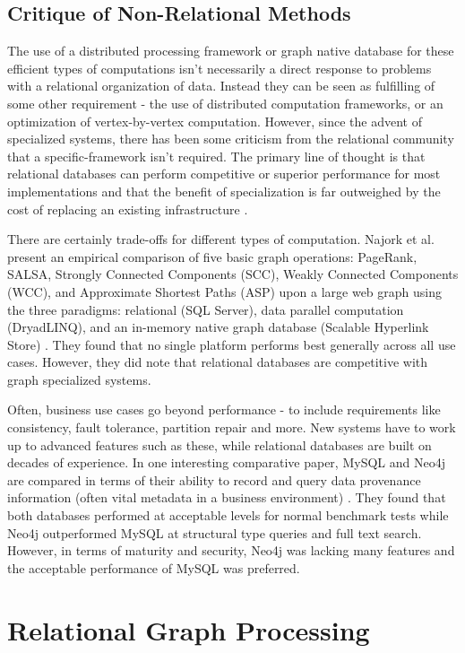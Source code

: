 \documentclass[11pt,letterpaper]{article}
\begin{document}
\subsection*{Critique of Non-Relational Methods}

The use of a distributed processing framework or graph native database for these efficient types of computations isn't necessarily a direct response to problems with a relational organization of data. Instead they can be seen as fulfilling of some other requirement - the use of distributed computation frameworks, or an optimization of vertex-by-vertex computation. However, since the advent of specialized systems, there has been some criticism from the relational community that a specific-framework isn't required. The primary line of thought is that relational databases can perform competitive or superior performance for most implementations and that the benefit of specialization is far outweighed by the cost of replacing an existing infrastructure \cite{welc_graph_2013}.

There are certainly trade-offs for different types of computation. Najork et al. present an empirical comparison of five basic graph operations: PageRank, SALSA, Strongly Connected Components (SCC), Weakly Connected Components (WCC), and Approximate Shortest Paths (ASP) upon a large web graph using the three paradigms: relational (SQL Server), data parallel computation (DryadLINQ), and an in-memory native graph database (Scalable Hyperlink Store) \cite{najork_hammers_2012}. They found that no single platform performs best generally across all use cases. However, they did note that relational databases are competitive with graph specialized systems.

Often, business use cases go beyond performance - to include requirements like consistency, fault tolerance, partition repair and more. New systems have to work up to advanced features such as these, while relational databases are built on decades of experience. In one interesting comparative paper, MySQL and Neo4j are compared in terms of their ability to record and query data provenance information (often vital metadata in a business environment) \cite{vicknair_comparison_2010}. They found that both databases performed at acceptable levels for normal benchmark tests while Neo4j outperformed MySQL at structural type queries and full text search. However, in terms of maturity and security, Neo4j was lacking many features and the acceptable performance of MySQL was preferred.

\section*{Relational Graph Processing}
\end{document}
